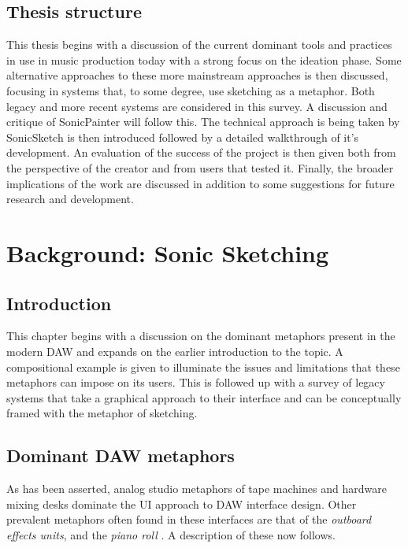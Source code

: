 \documentclass[12pt]{report}
\begin{document}
\chapter{Thesis structure}
\label{sec:org00b2426}
This thesis begins with a discussion of the current dominant tools and practices
in use in music production today with a strong focus on the ideation phase. Some
alternative approaches to these more mainstream approaches is then discussed,
focusing in systems that, to some degree, use sketching as a metaphor. Both
legacy and more recent systems are considered in this survey. A discussion and
critique of SonicPainter will follow this. The technical approach is being taken
by SonicSketch is then introduced followed by a detailed walkthrough of it's
development. An evaluation of the success of the project is then given both from
the perspective of the creator and from users that tested it. Finally, the
broader implications of the work are discussed in addition to some suggestions
for future research and development.

\newpage

\part{Background: Sonic Sketching}
\label{sec:orge612c37}
\chapter{Introduction}
\label{sec:org75b75f4}
This chapter begins with a discussion on the dominant metaphors present in the
modern DAW and expands on the earlier introduction to the topic. A compositional
example is given to illuminate the issues and limitations that these metaphors
can impose on its users. This is followed up with a survey of legacy systems
that take a graphical approach to their interface and can be conceptually framed
with the metaphor of sketching.

\chapter{Dominant DAW metaphors}
\label{sec:org4b6452b}
As has been asserted, analog studio metaphors of tape machines and hardware
mixing desks dominate the UI approach to DAW interface design. Other prevalent
metaphors often found in these interfaces are that of the \emph{outboard effects
units}, and the \emph{piano roll}
\cite{bell_journal_2015,levin_painterly_2000}.
A description of these now follows.
\end{document}
